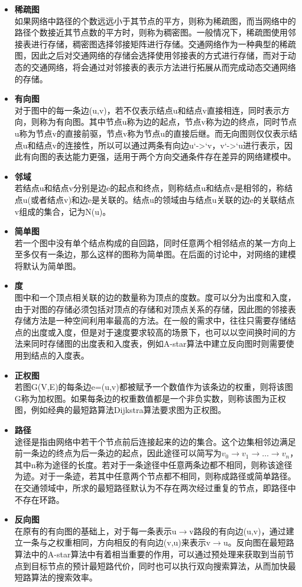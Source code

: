 \begin{itemize}
    \item \textbf{稀疏图}\\如果网络中路径的个数远远小于其节点的平方，则称为稀疏图，而当网络中的路径个数接近其节点数的平方时，则称为稠密图。一般情况下，稀疏图使用邻接表进行存储，稠密图选择邻接矩阵进行存储。交通网络作为一种典型的稀疏图，因此之后对交通网络的存储会选择使用邻接表的方式进行存储，而对于动态的交通网络，将会通过对邻接表的表示方法进行拓展从而完成动态交通网络的存储。
    \item \textbf{有向图}\\对于图中的每一条边(u,v)，若不仅表示结点u和结点v直接相连，同时表示方向，则称为有向图。其中节点u称为边的起点，节点v称为边的终点，同时节点u称为节点v的直接前驱，节点v称为节点u的直接后继。而无向图则仅仅表示结点u和结点v的连接性，所以可以通过两条有向边u`->`v，v`->`u进行表示，因此有向图的表达能力更强，适用于两个方向交通条件存在差异的网络建模中。
    \item \textbf{邻域}\\若结点u和结点v分别是边e的起点和终点，则称结点u和结点v是相邻的，称结点u(或者结点v)和边e是关联的。结点u的领域由与结点u关联的边e的关联结点v组成的集合，记为N(u)。
    \item \textbf{简单图}\\若一个图中没有单个结点构成的自回路，同时任意两个相邻结点的某一方向上至多仅有一条边，那么这样的图称为简单图。在后面的讨论中，对网络的建模将默认为简单图。
    \item \textbf{度}\\图中和一个顶点相关联的边的数量称为顶点的度数。度可以分为出度和入度，由于对图的存储必须包括对顶点的存储和对顶点关系的存储，因此图的邻接表存储方法是一种空间利用率最高的方法。在一般的需求中，往往只需要存储结点的出度或入度，但是对于速度要求较高的场景下，也可以以空间换时间的方法来同时存储图的出度表和入度表，例如A-star算法中建立反向图时则需要使用到结点的入度表。
    \item \textbf{正权图}\\若图G(V,E)的每条边e=(u,v)都被赋予一个数值作为该条边的权重，则将该图G称为加权图。如果每条边的权重数值都是一个非负实数，则称该图为正权图，例如经典的最短路算法Dijkstra算法要求图为正权图。
    \item \textbf{路径}\\途径是指由网络中若干个节点前后连接起来的边的集合。这个边集相邻边满足前一条边的终点为后一条边的起点，因此途径可以简写为$v_0\to v_1\to \dots \to v_n$，其中n称为途径的长度。若对于一条途径中任意两条边都不相同，则称该途径为迹。对于一条迹，若其中任意两个节点都不相同，则称成路径或简单路径。在交通领域中，所求的最短路径默认为不存在两次经过重复的节点，即路径中不存在环路。
    \item \textbf{反向图}\\在原有的有向图的基础上，对于每一条表示u$\to$v路段的有向边(u,v)，通过建立一条与之权重相同，方向相反的有向边(v,u)来表示v$\to$u。反向图在最短路算法中的A-star算法中有着相当重要的作用，可以通过预处理来获取到当前节点到目标节点的预计最短路代价，同时也可以执行双向搜索算法，从而加快最短路算法的搜索效率。
\end{itemize}


